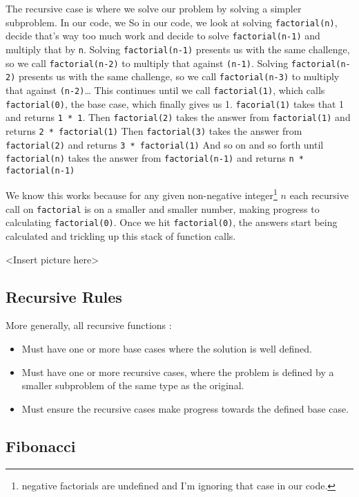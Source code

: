 The recursive case is where we solve our problem by solving a simpler subproblem.
In our code, we
So in our code, we look at solving \texttt{factorial(n)}, decide that's way too much work and decide to solve \texttt{factorial(n-1)} and multiply that by \texttt{n}.
Solving \texttt{factorial(n-1)} presents us with the same challenge, so we call \texttt{factorial(n-2)} to multiply that against \texttt{(n-1)}.  
Solving \texttt{factorial(n-2)} presents us with the same challenge, so we call \texttt{factorial(n-3)} to multiply that against \texttt{(n-2)}\dots  
This continues until we call \texttt{factorial(1)}, which calls \texttt{factorial(0)}, the base case, which finally gives us 1.  \texttt{facorial(1)} takes that 1 and returns \texttt{1 * 1}. 
Then \texttt{factorial(2)} takes the answer from \texttt{factorial(1)} and returns \texttt{2 * \texttt{factorial(1)}}
Then \texttt{factorial(3)} takes the answer from \texttt{factorial(2)} and returns \texttt{3 * \texttt{factorial(1)}}
And so on and so forth until \texttt{factorial(n)} takes the answer from \texttt{factorial(n-1)} and returns \texttt{n * \texttt{factorial(n-1)}}

We know this works because for any given non-negative integer\footnote{negative factorials are undefined and I'm ignoring that case in our code.} $n$  each recursive call on \texttt{factorial} is on a smaller and smaller number, making progress to calculating \texttt{factorial(0)}. Once we hit \texttt{factorial(0)}, the answers start being calculated and trickling up this stack of function calls.


<Insert picture here>

\subsection{Recursive Rules}

More generally, all recursive functions :
\begin{itemize}
	\item Must have one or more base cases where the solution is well defined.
	\item Must have one or more recursive cases, where the problem is defined by a smaller subproblem of the same type as the original.
	\item Must ensure the recursive cases make progress towards the defined base case.
\end{itemize}

\subsection{Fibonacci}


